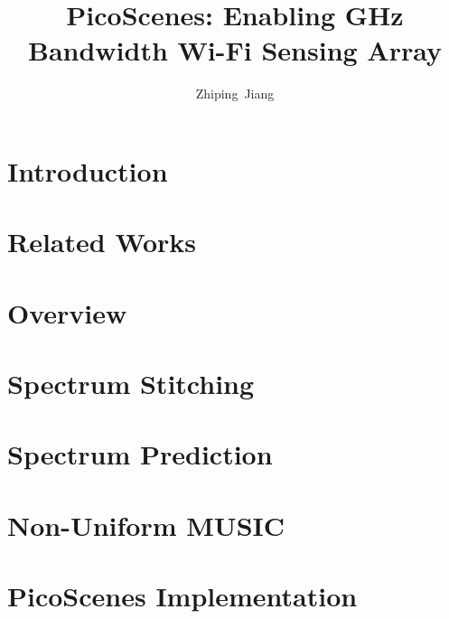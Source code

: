 \documentclass{sig-alternate-10pt}
\def\ourprotocol{{PicoScenes}\xspace}
\def\titletext{{\ourprotocol: Enabling GHz Bandwidth Wi-Fi Sensing Array}\xspace}
\begin{document}
\title{\titletext}

\author{Zhiping~Jiang}

\maketitle

\begin{abstract}

\end{abstract}

\section{Introduction} %
\label{sec:introduction}


\section{Related Works} %
\label{sec:related_works}


\section{Overview} %
\label{sec:overview}


\section{Spectrum Stitching} %
\label{sec:spectrum_stitching}


\section{Spectrum Prediction} %
\label{sec:spectrum_prediction}


\section{Non-Uniform MUSIC} %
\label{sec:non_uniform_music}


\section{PicoScenes Implementation} %
\label{sec:picoscenes_implementation}

\end{document}
